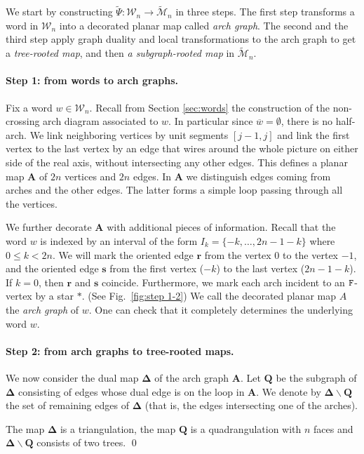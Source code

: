 \documentclass[a4paper]{article}
\newcommand*{\map}{\mathbf}
\newcommand*{\M}{\mathcal{M}}
\newcommand*{\W}{\mathcal{W}}
\newcommand*{\wt}{\widetilde}
\begin{document}
We start by constructing $\wt{\Psi}:\W_n\to\wt{\M}_n$ in three steps.
The first step transforms a word in $\W_n$ into a decorated planar map called \emph{arch graph}.
The second and the third step apply graph duality and local transformations to the arch graph to get a \emph{tree-rooted map}, and then \emph{a subgraph-rooted map} in $\wt{\M}_n$.

\paragraph{Step 1: from words to arch graphs.}
Fix a word $w\in\W_n$.
Recall from Section \ref{sec:words} the construction of the non-crossing arch diagram associated to $w$.
In particular since $\overline{w}= \emptyset$, there is no half-arch.
We link neighboring vertices by unit segments $[j-1,j]$ and link the first vertex to the last vertex by an edge that wires around the whole picture on either side of the real axis, without intersecting any other edges.
This defines a planar map $\map{A}$ of $2n$ vertices and $2n$ edges.
In $\map{A}$ we distinguish edges coming from arches and the other edges.
The latter forms a simple loop passing through all the vertices.

We further decorate $\map{A}$ with additional pieces of information.
Recall that the word $w$ is indexed by an interval of the form $I_k=\{-k,\ldots,2n-1-k\}$ where $0\leq k<2n$. We will mark the oriented edge $\map{r}$ from the vertex $0$ to the vertex $-1$, and the oriented edge $\map{s}$ from the first vertex ($-k$) to the last vertex ($2n-1-k$).
If $k=0$, then $\map{r}$ and $\map{s}$ coincide.
Furthermore, we mark each arch incident to an $\mathtt{F}$-vertex by a star $*$. (See Fig.~\ref{fig:step 1-2})
We call the decorated planar map $A$ the \emph{arch graph} of $w$.
One can check that it completely determines the underlying word $w$.

\paragraph{Step 2: from arch graphs to tree-rooted maps.}
We now consider the dual map $\map{\Delta}$ of the arch graph $\map{A}$.
Let $\map{Q}$ be the subgraph of $\map{\Delta}$ consisting of edges whose dual edge is on the loop in $\map{A}$.
We denote by $\map{\Delta\backslash Q}$ the set of remaining edges of $\map{\Delta}$ (that is, the edges intersecting one of the arches).

\begin{prop} The map $\map{\Delta}$ is a triangulation, the map $\map{Q}$ is a quadrangulation with $n$ faces and $\map{\Delta}\backslash \map{Q}$ consists of two trees.
\qed
\end{prop}
\end{document}
